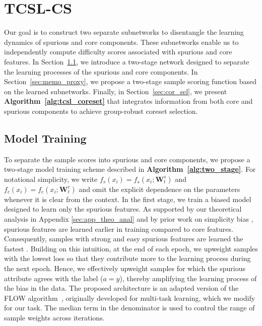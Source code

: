 \documentclass[letter,11pt]{article}
\begin{document}
\section{TCSL-CS}\label{sec:model}
Our goal is to construct two separate subnetworks to disentangle the learning dynamics of spurious and core components. These subnetworks enable us to independently compute difficulty scores associated with spurious and core features. In Section~\ref{sec:model_train}, we introduce a two-stage network designed to separate the learning processes of the spurious and core components. In Section~\ref{sec:memo_proxy}, we propose a two-stage sample scoring function based on the learned subnetworks. Finally, in Section~\ref{sec:cor_sel}, we present \textbf{Algorithm~\ref{alg:tcsl_coreset}} that integrates information from both core and spurious components to achieve group-robust coreset selection.

\subsection{Model Training}\label{sec:model_train}
To separate the sample scores into spurious and core components, we propose a two-stage model training scheme described in \textbf{Algorithm~\ref{alg:two_stage}}. For notational simplicity, we write
$f_s(x_i) = f_s(x_i;\mathbf{W}_t^s)$ and
$f_c(x_i) = f_c(x_i;\mathbf{W}_t^c)$
and omit the explicit dependence on the parameters whenever it is clear from the context. In the first stage, we train a biased model designed to learn only the spurious features. As supported by our theoretical analysis in Appendix \ref{sec:app_theo_anal} and by prior work on simplicity bias \citep{SPARE, PDE, COMP_MATTERS}, spurious features are learned earlier in training compared to core features. Consequently, samples with strong and easy spurious features are learned the fastest \citep{PDE}. Building on this intuition, at the end of each epoch, we upweight samples with the lowest loss so that they contribute more to the learning process during the next epoch. Hence, we effectively upweight samples for which the spurious attribute agrees with the label ($a = y$), thereby amplifying the learning process of the bias in the data. The proposed architecture is an adapted version of the FLOW algorithm~\citep{FLOW}, originally developed for multi-task learning, which we modify for our task. The median term in the denominator is used to control the range of sample weights across iterations.
\end{document}
